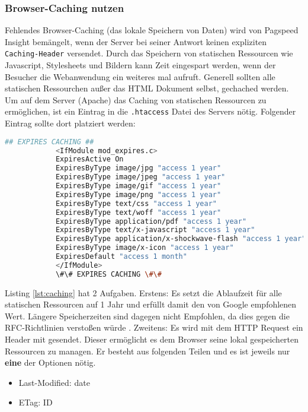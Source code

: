 		\subsubsection{Browser-Caching nutzen} %
		\label{ssub:browser_caching_nutzen}
			Fehlendes Browser-Caching (das lokale Speichern von Daten) wird von Pagspeed Insight bemängelt, wenn der Server bei seiner Antwort keinen expliziten \texttt{Caching-Header} versendet.
			Durch das Speichern von statischen Ressourcen wie Javascript, Stylesheets und Bildern kann Zeit eingespart werden, wenn der Besucher die Webanwendung ein weiteres mal aufruft. Generell sollten alle statischen Ressourchen außer das HTML Dokument selbst, gechached werden.\\

			Um auf dem Server (Apache) das Caching von statischen Ressourcen zu ermöglichen, ist ein Eintrag in die \texttt{.htaccess} Datei des Servers nötig. Folgender Eintrag sollte dort platziert werden:

		  \begin{lstlisting}[captionpos=b, caption=Aktivieren von Browser Caching in Apache (Listing nach: \autocite{sextonCaching}), label=lst:caching, language=bash]
		  	## EXPIRES CACHING ##
		  	<IfModule mod_expires.c>
		  	ExpiresActive On
		  	ExpiresByType image/jpg "access 1 year"
		  	ExpiresByType image/jpeg "access 1 year"
		  	ExpiresByType image/gif "access 1 year"
		  	ExpiresByType image/png "access 1 year"
		  	ExpiresByType text/css "access 1 year"
		  	ExpiresByType text/woff "access 1 year"
		  	ExpiresByType application/pdf "access 1 year"
		  	ExpiresByType text/x-javascript "access 1 year"
		  	ExpiresByType application/x-shockwave-flash "access 1 year"
		  	ExpiresByType image/x-icon "access 1 year"
		  	ExpiresDefault "access 1 month"
		  	</IfModule>
		  	\#\# EXPIRES CACHING \#\#
		  \end{lstlisting}

		  Listing \ref{lst:caching} hat 2 Aufgaben. Erstens: Es setzt die Ablaufzeit für alle statischen Ressourcen auf 1 Jahr und erfüllt damit den von Google empfohlenen Wert. Längere Speicherzeiten sind dagegen nicht Empfohlen, da dies gegen die RFC-Richtlinien verstoßen würde \autocite{google14Caching}. Zweitens: Es wird mit dem HTTP Request ein Header mit gesendet. Dieser ermöglicht es dem Browser seine lokal gespeicherten Ressourcen zu managen. Er besteht aus folgenden Teilen und es ist jeweils nur \textbf{eine} der Optionen nötig.

		  \begin{itemize}
		  	\item Last-Modified: date
		  	\item ETag: ID
		  \end{itemize}

